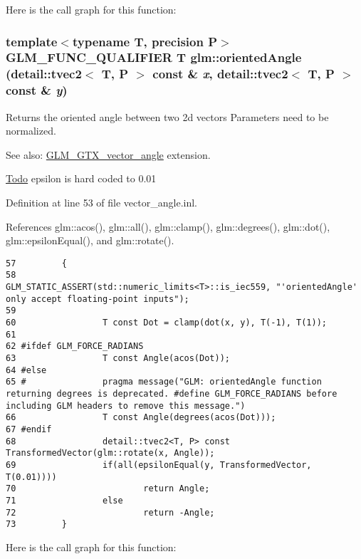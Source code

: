 Here is the call graph for this function:\hypertarget{group__gtx__vector__angle_gfd969749b953f7a58da4a2563d06ea36}{
\subsubsection[orientedAngle]{\setlength{\rightskip}{0pt plus 5cm}template$<$typename T, precision P$>$ GLM\_\-FUNC\_\-QUALIFIER T glm::orientedAngle (detail::tvec2$<$ T, P $>$ const \& {\em x}, \/  detail::tvec2$<$ T, P $>$ const \& {\em y})}}
\label{group__gtx__vector__angle_gfd969749b953f7a58da4a2563d06ea36}


Returns the oriented angle between two 2d vectors Parameters need to be normalized. \begin{Desc}
\item[See also:]\hyperlink{group__gtx__vector__angle}{GLM\_\-GTX\_\-vector\_\-angle} extension.\end{Desc}
\begin{Desc}
\item[\hyperlink{todo__todo000052}{Todo}]epsilon is hard coded to 0.01 \end{Desc}


Definition at line 53 of file vector\_\-angle.inl.

References glm::acos(), glm::all(), glm::clamp(), glm::degrees(), glm::dot(), glm::epsilonEqual(), and glm::rotate().

\begin{Code}\begin{verbatim}57         {
58                 GLM_STATIC_ASSERT(std::numeric_limits<T>::is_iec559, "'orientedAngle' only accept floating-point inputs");
59 
60                 T const Dot = clamp(dot(x, y), T(-1), T(1));
61 
62 #ifdef GLM_FORCE_RADIANS
63                 T const Angle(acos(Dot));
64 #else
65 #               pragma message("GLM: orientedAngle function returning degrees is deprecated. #define GLM_FORCE_RADIANS before including GLM headers to remove this message.")
66                 T const Angle(degrees(acos(Dot)));
67 #endif
68                 detail::tvec2<T, P> const TransformedVector(glm::rotate(x, Angle));
69                 if(all(epsilonEqual(y, TransformedVector, T(0.01))))
70                         return Angle;
71                 else
72                         return -Angle;
73         }
\end{verbatim}
\end{Code}




Here is the call graph for this function: